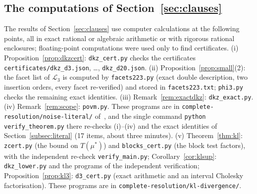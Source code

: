 \documentclass[11pt]{amsart}
\theoremstyle{definition}
\theoremstyle{remark}
\numberwithin{equation}{section}
\newcommand{\cL}{\mathcal{L}}
\begin{document}
\subsection{The computations of Section~\ref{sec:clauses}}\label{subsec:clausecomp}
The results of Section~\ref{sec:clauses} use computer calculations at the following points, all in exact rational or
algebraic arithmetic or with rigorous rational enclosures; floating-point computations were used only to find
certificates. (i) Proposition~\ref{prop:dkzcert}: \texttt{dkz\_cert.py} checks the certificates
\texttt{certificates/dkz\_d3.json}, \dots, \texttt{dkz\_d20.json}. (ii) Proposition~\ref{prop:small}(2): the facet list
of $\cL_3$ is computed by \texttt{facets223.py} (exact double description, two insertion orders, every facet
re-verified) and stored in \texttt{facets223.txt}; \texttt{phi3.py} checks the remaining exact identities. (iii)
Remark~\ref{rem:exactdkz}: \texttt{dkz\_exact.py}. (iv) Remark~\ref{rem:scope}: \texttt{povm.py}. These programs are in
\texttt{complete-resolution/noise-literal/} of~\cite{repo-oqp27}, and the single command \texttt{python
verify\_theorem.py} there re-checks (i)--(iv) and the exact identities of Section~\ref{subsec:literal} (17 items, about
three minutes). (v) Theorem~\ref{thm:kl}: \texttt{zcert.py} (the bound on $T(\mu^*)$) and \texttt{blocks\_cert.py} (the
block test factors), with the independent re-check \texttt{verify\_main.py}; Corollary~\ref{cor:klsup}: \texttt{dkz\_lower.py}
and the programs of the independent verification; Proposition~\ref{prop:kl3}: \texttt{d3\_cert.py} (exact arithmetic
and an interval Cholesky factorisation). These programs are in \texttt{complete-resolution/kl-divergence/}.
\end{document}

